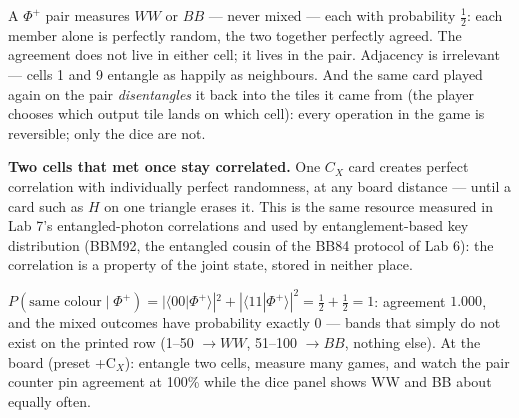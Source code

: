 \documentclass[a4paper,11pt]{article}
\providecommand{\braket}[2]{\langle#1|#2\rangle}
\begin{document}
A $\Phi^+$ pair measures $WW$ or $BB$ --- never mixed --- each with probability
$\tfrac12$: each member alone is perfectly random, the two together perfectly agreed.
The agreement does not live in either cell; it lives in the pair. Adjacency is
irrelevant --- cells 1 and 9 entangle as happily as neighbours. And the same card played
again on the pair \emph{disentangles} it back into the tiles it came from (the player
chooses which output tile lands on which cell): every operation in the game is
reversible; only the dice are not.

\begin{shockbox}
\textbf{Two cells that met once stay correlated.} One $C_X$ card creates perfect
correlation with individually perfect randomness, at any board distance --- until a
card such as $H$ on one triangle erases it. This is the same resource measured in Lab
7's entangled-photon correlations and used by entanglement-based key distribution
(BBM92, the entangled cousin of the BB84 protocol of Lab 6): the correlation is a
property of the joint state, stored in neither place.
\end{shockbox}

\begin{numberbox}
$P(\text{same colour} \mid \Phi^+) = |\braket{00}{\Phi^+}|^2 + |\braket{11}{\Phi^+}|^2
= \tfrac12 + \tfrac12 = 1$: agreement $1.000$, and the mixed outcomes have probability
exactly $0$ --- bands that simply do not exist on the printed row (1--50 $\to WW$,
51--100 $\to BB$, nothing else). At the board (preset +C$_X$): entangle two cells,
measure many games, and watch the pair counter pin agreement at 100\% while the dice
panel shows WW and BB about equally often.
\end{numberbox}
\end{document}
